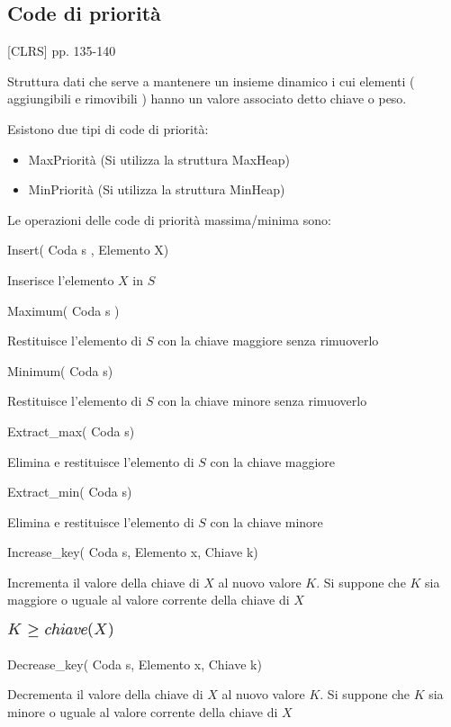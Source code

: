 \documentclass{article}
\providecommand{\tightlist}{%
  \setlength{\itemsep}{0pt}\setlength{\parskip}{0pt}}
\begin{document}
{\hypertarget{h.jih9riph7gns}{\subsection{\texorpdfstring{{Code di
priorità}}{Code di priorità}}\label{h.jih9riph7gns}}

{{[}CLRS{]} pp. 135-140}

{Struttura dati che serve a mantenere un insieme dinamico i cui elementi ( aggiungibili e rimovibili ) hanno un valore associato detto chiave o peso.}

{Esistono due tipi di code di priorità:}

\begin{itemize}
\tightlist
\item
  {MaxPriorità (Si utilizza la struttura MaxHeap)}
\item
  {MinPriorità (Si utilizza la struttura MinHeap)}
\end{itemize}

{Le operazioni delle code di priorità massima/minima sono:}

{Insert( Coda s , Elemento X)}

{Inserisce l'elemento $X$ in $S$}

{Maximum( Coda s )}

{Restituisce l'elemento di $S$ con la chiave maggiore senza rimuoverlo}

{Minimum( Coda s) }

{Restituisce l'elemento di $S$ con la chiave minore senza rimuoverlo}

{Extract\_max( Coda s)}

{Elimina e restituisce l'elemento di $S$ con la chiave maggiore}

{Extract\_min( Coda s) }

{Elimina e restituisce l'elemento di $S$ con la chiave minore}

{Increase\_key( Coda s, Elemento x, Chiave k) }

{Incrementa il valore della chiave di $X$ al nuovo valore $K$. Si suppone che $K$ sia maggiore o uguale al valore corrente della chiave di $X$}

\includegraphics{images/image142.png}

{Decrease\_key( Coda s, Elemento x, Chiave k)}

{Decrementa il valore della chiave di $X$ al nuovo valore $K$. Si suppone che $K$ sia minore o uguale al valore corrente della chiave di $X$}

}
\end{document}

